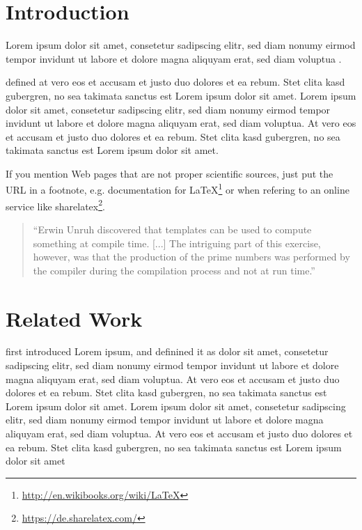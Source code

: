 \documentclass[12pt,a4paper]{article}
\title{\titlename}
\author{ \authorname\\ \scriptsize \authormail \\ \scriptsize \address }
\date{\exposedate}
\begin{document}

\maketitle

\section*{Introduction}

Lorem ipsum dolor sit amet, consetetur sadipscing elitr, sed diam nonumy eirmod tempor invidunt ut labore et dolore magna aliquyam erat, sed diam voluptua \autocite[]{McConnell:2004:CCS:1096143}.

\textcite[]{Vandevoorde:2002} defined at vero eos et accusam et justo duo dolores et ea rebum. Stet clita kasd gubergren, no sea takimata sanctus est Lorem ipsum dolor sit amet. Lorem ipsum dolor sit amet, consetetur sadipscing elitr, sed diam nonumy eirmod tempor invidunt ut labore et dolore magna aliquyam erat, sed diam voluptua. At vero eos et accusam et justo duo dolores et ea rebum. Stet clita kasd gubergren, no sea takimata sanctus est Lorem ipsum dolor sit amet.

If you mention Web pages that are not proper scientific sources, just put the URL in a footnote, e.g. documentation for \LaTeX\footnote{\url{http://en.wikibooks.org/wiki/LaTeX}}
or when refering to an online service like  sharelatex\footnote{\url{https://de.sharelatex.com/}}.


\begin{quote}
``Erwin Unruh discovered that templates can be used to compute
something at compile time. [...] The intriguing part of this exercise, however, was that the production of the prime numbers was performed by the compiler during the compilation process and not at run time.''
\autocite[305]{Vandevoorde:2002}
\end{quote}

\section*{Related Work}

\textcite[]{Vandevoorde:2002} first introduced Lorem ipsum, and definined it as dolor sit amet, consetetur sadipscing elitr, sed diam nonumy eirmod tempor invidunt ut labore et dolore magna aliquyam erat, sed diam voluptua. At vero eos et accusam et justo duo dolores et ea rebum. Stet clita kasd gubergren, no sea takimata sanctus est Lorem ipsum dolor sit amet. Lorem ipsum dolor sit amet, consetetur sadipscing elitr, sed diam nonumy eirmod tempor invidunt ut labore et dolore magna aliquyam erat, sed diam voluptua. At vero eos et accusam et justo duo dolores et ea rebum. Stet clita kasd gubergren, no sea takimata sanctus est Lorem ipsum dolor sit amet 
\end{document}
